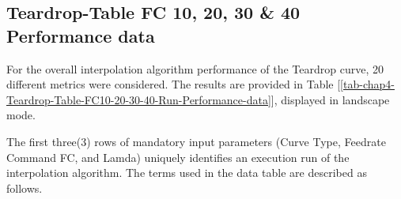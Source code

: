 \clearpage
\pagebreak

\subsection{Teardrop-Table FC 10, 20, 30 \& 40 Performance data}
\label{ssec-chap4-Teardrop-Table-FC10-20-30-40-Run-Performance-data}

For the overall interpolation algorithm performance of the Teardrop curve, 20 different metrics were considered. The results are provided in Table [\ref{tab-chap4-Teardrop-Table-FC10-20-30-40-Run-Performance-data}], displayed in landscape mode.

The first three(3) rows of mandatory input parameters (Curve Type, Feedrate Command FC, and Lamda) uniquely identifies an execution run of the interpolation algorithm. The terms used in the data table are described as follows.\\

